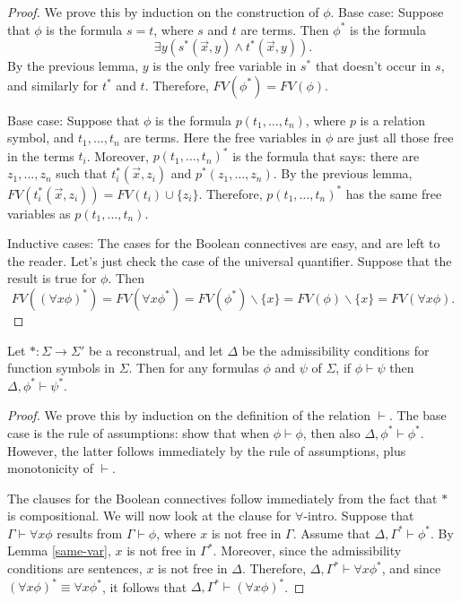 \begin{proof} We prove this by induction on the construction of
  $\phi$.  Base case: Suppose that $\phi$ is the formula $s=t$, where
  $s$ and $t$ are terms.  Then $\phi ^*$ is the formula
  \[ \exists y(s^*(\vec{x},y)\wedge t^*(\vec{x},y)) .\]
  By the previous lemma, $y$ is the only free variable in $s^*$ that
  doesn't occur in $s$, and similarly for $t^*$ and $t$.  Therefore,
  $FV(\phi ^*)=FV(\phi )$.

  Base case: Suppose that $\phi$ is the formula $p(t_1,\dots ,t_n)$,
  where $p$ is a relation symbol, and $t_1,\dots ,t_n$ are terms.
  Here the free variables in $\phi$ are just all those free in the
  terms $t_i$.  Moreover, $p(t_1,\dots ,t_n)^*$ is the formula that
  says: there are $z_1,\dots ,z_n$ such that $t_i^*(\vec{x},z_i)$ and
  $p^*(z_1,\dots ,z_n)$.  By the previous lemma,
  $FV(t_i^*(\vec{x},z_i))=FV(t_i)\cup \{ z_i\}$.  Therefore,
  $p(t_1,\dots ,t_n)^*$ has the same free variables as
  $p(t_1,\dots ,t_n)$.

  Inductive cases: The cases for the Boolean connectives are easy, and
  are left to the reader.  Let's just check the case of the universal
  quantifier.  Suppose that the result is true for $\phi$.  Then
  \[ FV((\forall x\phi )^*) = FV(\forall x\phi ^*) = FV(\phi ^*
    )\backslash \{ x\} = FV(\phi )\backslash \{ x\} = FV (\forall
    x\phi ) .\]
\end{proof}



\begin{thm}[Substitution] Let $\ast :\Sigma\to\Sigma '$ be a
  reconstrual, and let $\Delta$ be the admissibility conditions for
  function symbols in $\Sigma$.  Then for any formulas $\phi$ and
  $\psi$ of $\Sigma$, if $\phi\vdash \psi$ then
  $\Delta ,\phi ^*\vdash \psi ^*$.  \label{sub-thm} \end{thm}

\begin{proof} We prove this by induction on the definition of the
  relation $\vdash$.  The base case is the rule of assumptions: show
  that when $\phi\vdash\phi$, then also
  $\Delta ,\phi ^*\vdash \phi ^*$.  However, the latter follows
  immediately by the rule of assumptions, plus monotonicity of
  $\vdash$.

  The clauses for the Boolean connectives follow immediately from the
  fact that $\ast$ is compositional.  We will now look at the clause
  for $\forall$-intro.  Suppose that $\Gamma\vdash \forall x\phi$
  results from $\Gamma\vdash \phi$, where $x$ is not free in $\Gamma$.
  Assume that $\Delta ,\Gamma ^*\vdash \phi ^*$.  By Lemma
  \ref{same-var}, $x$ is not free in $\Gamma ^*$.  Moreover, since the
  admissibility conditions are sentences, $x$ is not free in $\Delta$.
  Therefore, $\Delta ,\Gamma ^*\vdash \forall x\phi ^*$, and since
  $(\forall x\phi )^*\equiv \forall x\phi ^*$, it follows that
  $\Delta ,\Gamma ^*\vdash (\forall x\phi )^*$.  \end{proof}


